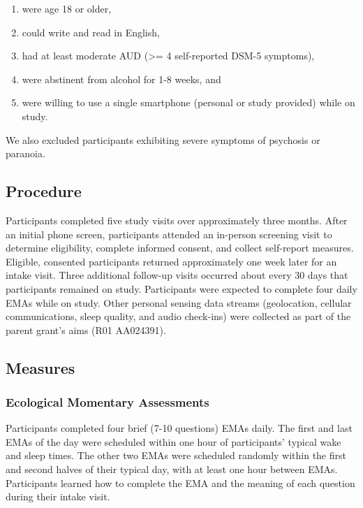 \documentclass[
]{agujournal2019}
\providecommand{\tightlist}{%
  \setlength{\itemsep}{0pt}\setlength{\parskip}{0pt}}\usepackage{longtable,booktabs,array}
\begin{document}
\begin{enumerate}
\def\labelenumi{\arabic{enumi}.}
\tightlist
\item
  were age 18 or older,
\item
  could write and read in English,
\item
  had at least moderate AUD (\textgreater= 4 self-reported DSM-5
  symptoms),
\item
  were abstinent from alcohol for 1-8 weeks, and
\item
  were willing to use a single smartphone (personal or study provided)
  while on study.
\end{enumerate}

We also excluded participants exhibiting severe symptoms of psychosis or
paranoia.

\subsection{Procedure}\label{procedure}

Participants completed five study visits over approximately three
months. After an initial phone screen, participants attended an
in-person screening visit to determine eligibility, complete informed
consent, and collect self-report measures. Eligible, consented
participants returned approximately one week later for an intake visit.
Three additional follow-up visits occurred about every 30 days that
participants remained on study. Participants were expected to complete
four daily EMAs while on study. Other personal sensing data streams
(geolocation, cellular communications, sleep quality, and audio
check-ins) were collected as part of the parent grant's aims (R01
AA024391).

\subsection{Measures}\label{measures}

\subsubsection{Ecological Momentary
Assessments}\label{ecological-momentary-assessments}

Participants completed four brief (7-10 questions) EMAs daily. The first
and last EMAs of the day were scheduled within one hour of participants'
typical wake and sleep times. The other two EMAs were scheduled randomly
within the first and second halves of their typical day, with at least
one hour between EMAs. Participants learned how to complete the EMA and
the meaning of each question during their intake visit.
\end{document}

